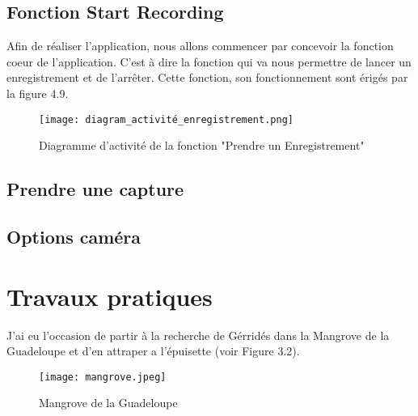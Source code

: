         \subsection{Fonction Start Recording}
            Afin de réaliser l'application, nous allons commencer par concevoir la fonction coeur de l'application.
            C'est à dire la fonction qui va nous permettre de lancer un enregistrement et de l'arrêter.    
            Cette fonction, son fonctionnement sont érigés par la figure 4.9.
            \begin{figure}
                \centering
                \texttt{[image: diagram\_activité\_enregistrement.png]} 
                \caption{Diagramme d'activité de la fonction "Prendre un Enregistrement"}
            \end{figure}


        \subsection{Prendre une capture}

        \subsection{Options caméra}

    \section{Travaux pratiques}
    J'ai eu l'occasion de partir à la recherche de Gérridés dans la Mangrove de la Guadeloupe et d'en attraper a l'épuisette (voir Figure 3.2).

    \begin{figure}[h]
        \centering
        \texttt{[image: mangrove.jpeg]}
        \caption{Mangrove de la Guadeloupe}
    \end{figure}
        
        